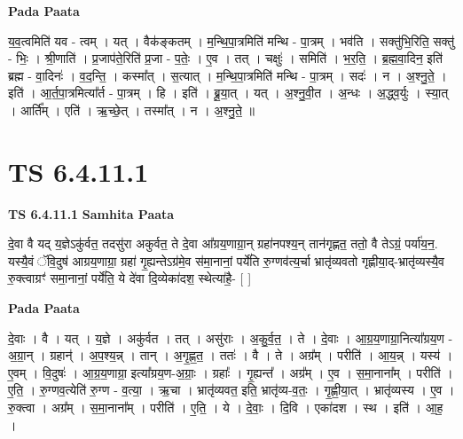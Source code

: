\documentclass[17pt]{extarticle}
\begin{document}
\textbf{Pada Paata} \newline

य॒व॒त्वमिति॑ यव - त्वम् । यत् । वैक॑ङ्कतम् । म॒न्थि॒पा॒त्रमिति॑ मन्थि - पा॒त्रम् । भव॑ति । सक्तु॑भि॒रिति॒ सक्तु॑ - भिः॒ । श्री॒णाति॑ । प्र॒जाप॑ते॒रिति॑ प्र॒जा - प॒तेः॒ । ए॒व । तत् । चक्षुः॑ । समिति॑ । भ॒र॒ति॒ । ब्र॒ह्म॒वा॒दिन॒ इति॑ ब्रह्म - वा॒दिनः॑ । व॒द॒न्ति॒ । कस्मा᳚त् । स॒त्यात् । म॒न्थि॒पा॒त्रमिति॑ मन्थि - पा॒त्रम् । सदः॑ । न । अ॒श्नु॒ते॒ । इति॑ । आ॒र्त॒पा॒त्रमित्या᳚र्त - पा॒त्रम् । हि । इति॑ । ब्रू॒या॒त् । यत् । अ॒श्नु॒वी॒त । अ॒न्धः । अ॒द्ध्व॒र्युः । स्या॒त् । आर्ति᳚म् । एति॑ । ऋ॒च्छे॒त् । तस्मा᳚त् । न । अ॒श्नु॒ते॒ ॥  \newline





\section{ TS 6.4.11.1 }

\textbf{TS 6.4.11.1 } \newline
\textbf{Samhita Paata} \newline

दे॒वा वै यद् य॒ज्ञेऽकु॑र्वत॒ तदसु॑रा अकुर्वत॒ ते दे॒वा आ᳚ग्रय॒णाग्रा॒न् ग्रहा॑नपश्य॒न् तान॑गृह्णत॒ ततो॒ वै तेऽग्रं॒ पर्या॑य॒न॒. यस्यै॒वं ॅवि॒दुष॑ आग्रय॒णाग्रा॒ ग्रहा॑ गृ॒ह्यन्तेऽग्र॑मे॒व स॑मा॒नानां॒ पर्ये॑ति रु॒ग्णव॑त्य॒र्चा भ्रातृ॑व्यवतो गृह्णीया॒द्-भ्रातृ॑व्यस्यै॒व रु॒क्त्वाग्रꣳ॑ समा॒नानां॒ पर्ये॑ति॒ ये दे॑वा दि॒व्येका॑दश॒ स्थेत्या॑है॒- [  ] \newline

\textbf{Pada Paata} \newline

दे॒वाः । वै । यत् । य॒ज्ञे । अकु॑र्वत । तत् । असु॑राः । अ॒कु॒र्व॒त॒ । ते । दे॒वाः । आ॒ग्र॒य॒णाग्रा॒नित्या᳚ग्रय॒ण - अ॒ग्रा॒न् । ग्रहान्॑ । अ॒प॒श्य॒न्न् । तान् । अ॒गृ॒ह्ण॒त॒ । ततः॑ । वै । ते । अग्र᳚म् । परीति॑ । आ॒य॒न्न् । यस्य॑ । ए॒वम् । वि॒दुषः॑ । आ॒ग्र॒य॒णाग्रा॒ इत्या᳚ग्रय॒ण-अ॒ग्राः॒ । ग्रहाः᳚ । गृ॒ह्यन्त᳚ । अग्र᳚म् । ए॒व । स॒मा॒नाना᳚म् । परीति॑ । ए॒ति॒ । रु॒ग्णव॒त्येति॑ रु॒ग्ण - व॒त्या॒ । ऋ॒चा । भ्रातृ॑व्यवत॒ इति॒ भ्रातृ॑व्य-व॒तः॒ । गृ॒ह्णी॒या॒त् । भ्रातृ॑व्यस्य । ए॒व । रु॒क्त्वा । अग्र᳚म् । स॒मा॒नाना᳚म् । परीति॑ । ए॒ति॒ । ये । दे॒वाः॒ । दि॒वि । एका॑दश । स्थ । इति॑ । आ॒ह॒ ।  \newline




\end{document}
